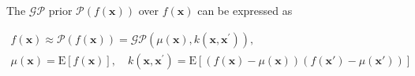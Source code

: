 
 
  
The $\mathcal{GP}$ prior $\mathcal{P}(f(\bm{x}))$ over $f(\bm{x})$ can be expressed as

\begin{multline}
f(\bm{x}) \approx \mathcal{P}(f(\bm{x})) = \mathcal{GP} ({\mu}(\bm{x}),k(\bm{x},\bm{x}^{'})),\\
{\mu}(\bm{x}) = \mathrm{E}[f(\bm{x})],\quad
k(\bm{x},\bm{x}^{'})=\mathrm{E}[(f(\bm{x})-\mu(\bm{x}))(f(\bm{x}')-\mu(\bm{x}'))]
\end{multline}
 
